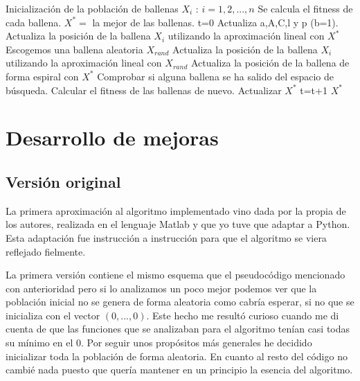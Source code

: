 \documentclass[12pt,a4paper]{article}
\begin{document}
		\begin{algorithm}[!h]
			\begin{algorithmic}[!h]
				\STATE Inicialización de la población de ballenas $X_i$ : $i=1,2,...,n$
				\STATE Se calcula el fitness de cada ballena.
				\STATE $X^*=$ la mejor de las ballenas.
				\STATE t=0
						\STATE Actualiza a,A,C,l y p (b=1).
								\STATE Actualiza la posición de la ballena $X_i$ utilizando la aproximación lineal con $X^*$
							\ELSE
								\STATE Escogemos una ballena aleatoria $X_{rand}$
								\STATE Actualiza la posición de la ballena $X_i$ utilizando la aproximación lineal con $X_{rand}$
							\ENDIF
						\ELSE
							\STATE Actualiza la posición de la ballena de forma espiral con $X^*$
						\ENDIF
					\ENDFOR
					\STATE Comprobar si alguna ballena se ha salido del espacio de búsqueda.
					\STATE Calcular el fitness de las ballenas de nuevo.
					\STATE Actualizar $X^*$
					\STATE t=t+1
				\ENDWHILE
				\RETURN $X^*$
			\end{algorithmic}
		\end{algorithm}
	
	\newpage
	
	\section{Desarrollo de mejoras}
	\label{sec:desarrolloMejoras}
	
	\subsection{Versión original}
	
	La primera aproximación al algoritmo implementado vino dada por la propia de los autores, realizada en el lenguaje Matlab y que yo tuve que adaptar a Python. Esta adaptación fue instrucción a instrucción para que el algoritmo se viera reflejado fielmente.
	
	La primera versión contiene el mismo esquema que el pseudocódigo mencionado con anterioridad pero si lo analizamos un poco mejor podemos ver que la población inicial no se genera de forma aleatoria como cabría esperar, si no que se inicializa con el vector $(0,...,0)$. Este hecho me resultó curioso cuando me di cuenta de que las funciones que se analizaban para el algoritmo tenían casi todas su mínimo en el 0. Por seguir unos propósitos más generales he decidido inicializar toda la población de forma aleatoria. En cuanto al resto del código no cambié nada puesto que quería mantener en un principio la esencia del algoritmo.
	
\end{document}
